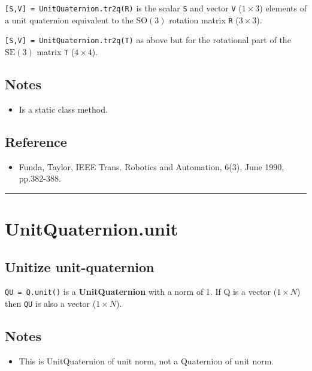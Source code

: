 \texttt{[S,V] = UnitQuaternion.tr2q(R)} is the scalar \texttt{S} and vector \texttt{V} ($1 \times 3$) elements of a
unit quaternion equivalent to the $\mbox{SO}(3)$ rotation matrix \texttt{R} ($3 \times 3$).



\texttt{[S,V] = UnitQuaternion.tr2q(T)} as above but for the rotational part of the $\mbox{SE}(3)$ matrix \texttt{T} ($4 \times 4$).


\subsection*{Notes}
\begin{itemize}
  \item Is a static class method.
\end{itemize}

\subsection*{Reference}
\begin{itemize}
  \item Funda, Taylor, IEEE Trans. Robotics and Automation, 6(3), June 1990, pp.382-388.
\end{itemize}
\vspace{1.5ex}\hrule

\hypertarget{UnitQuaternion.unit}{\section*{UnitQuaternion.unit}}
\subsection*{Unitize unit-quaternion}


\texttt{QU = Q.unit()} is a \textbf{\color{red} UnitQuaternion} with a norm of 1.  If Q is a vector ($1 \times N$) then
\texttt{QU} is also a vector ($1 \times N$).


\subsection*{Notes}
\begin{itemize}
  \item This is UnitQuaternion of unit norm, not a Quaternion of unit norm.
\end{itemize}

